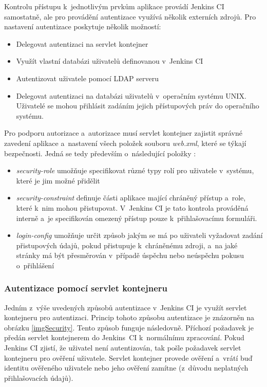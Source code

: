             Kontrolu přístupu k~jednotlivým prvkům aplikace provádí 
            Jenkins CI samostatně, ale pro provádění autentizace využívá několik externích zdrojů. Pro nastavení autentizace
            poskytuje několik možností:

            \begin{itemize}
                \item Delegovat autentizaci na servlet kontejner
                \item Využít vlastní databázi uživatelů definovanou v~Jenkins CI
                \item Autentizovat uživatele pomocí LDAP serveru
                \item Delegovat autentizaci na databázi uživatelů v~operačním systému UNIX. Uživatelé 
                    se mohou přihlásit zadáním jejich přístupových práv do operačního systému. 
            \end{itemize}
            
            Pro podporu autorizace a~autorizace musí servlet kontejner zajistit správné zavedení aplikace a~nastavení
            všech položek souboru \emph{web.xml}, které se týkají bezpečnosti. Jedná se tedy především
            o~následující položky \cite{webXml}:

            \begin{itemize}
                \item \emph{security-role} umožňuje specifikovat různé typy rolí pro uživatele v~systému,
                    které je jim možné přidělit
                \item \emph{security-constraint} definuje části aplikace mající chráněný přístup a~role, které k~nim
                    mohou přistupovat. V~Jenkins CI je tato kontrola prováděná interně a~je specifikován
                    omezený přístup pouze k~přihlašovacímu formuláři.
                \item \emph{login-config} umožňuje určit způsob jakým se má po uživateli vyžadovat zadání přistupových
                    údajů, pokud přistupuje k~chráněnému zdroji, a~na jaké stránky má být přesměrován v~případě úspěchu
                    nebo neúspěchu pokusu o~přihlášení
            \end{itemize}
            
    
            \subsubsection{Autentizace pomocí servlet kontejneru}
                Jedním z~výše uvedených způsobů autentizace v~Jenkins CI je využít servlet kontejneru pro autentizaci.
                Princip tohoto způsobu autentizace je znázorněn na obrázku \ref{imgSecurity}. 
                Tento způsob funguje následovně. Příchozí 
                požadavek je předán servlet kontejnerem do Jenkins~CI k~normálnímu zpracování. 
                Pokud Jenkins CI zjistí, že uživatel
                není autentizován, tak pošle požadavek servlet kontejneru pro ověření uživatele. Servlet
                kontejner provede ověření a~vrátí buď identitu ověřeného uživatele nebo jeho ověření zamítne (z~důvodu
                neplatných přihlašovacích údajů).
                
